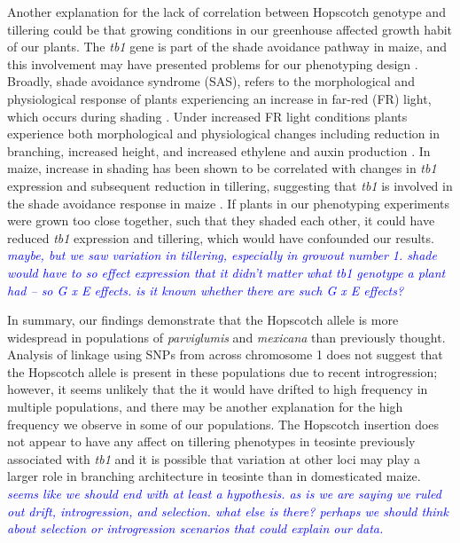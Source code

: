 \documentclass[12pt]{article}
\newcommand{\jri}[1]{\textcolor{blue}{ \emph{\scriptsize  #1}} }
\begin{document}
Another explanation for the lack of correlation between Hopscotch genotype and tillering could be that growing conditions in our greenhouse affected growth habit of our plants. The \emph{tb1} gene is part of the shade avoidance pathway in maize, and this involvement may have presented problems for our phenotyping design \citep{Kebrom and Brutnell 2007}. Broadly, shade avoidance syndrome (SAS), refers to the morphological and physiological response of plants experiencing an increase in far-red (FR) light, which occurs during shading \cite{Kebrom and Brutnell 2007}. Under increased FR light conditions plants experience both morphological and physiological changes including reduction in branching, increased height, and increased ethylene and auxin production \cite{Ballare 1999, Smith and Whitelam 1997}. In maize, increase in shading has been shown to be correlated with changes in \emph{tb1} expression and subsequent reduction in tillering, suggesting that \emph{tb1} is involved in the shade avoidance response in maize \cite{Doebley et al 1997, Lukens and Doebley 1999}. If plants in our phenotyping experiments were grown too close together, such that they shaded each other, it could have reduced \emph{tb1} expression and tillering, which would have confounded our results. \jri{maybe, but we saw variation in tillering, especially in growout number 1. shade would have to so effect expression that it didn't matter what tb1 genotype a plant had -- so G x E effects.  is it known whether there are such G x E effects?}

In summary, our findings demonstrate that the Hopscotch allele is more widespread in populations of \emph{parviglumis} and \emph{mexicana} than previously thought. Analysis of linkage using SNPs from across chromosome 1 does not suggest that the Hopscotch allele is present in these populations due to recent introgression; however, it seems unlikely that the it would have drifted to high frequency in multiple populations, and there may be another explanation for the high frequency we observe in some of our populations. The Hopscotch insertion does not appear to have any affect on tillering phenotypes in teosinte previously associated with \emph{tb1} and it is possible that variation at other loci may play a larger role in branching architecture in teosinte than in domesticated maize. \jri{seems like we should end with at least a hypothesis. as is we are saying we ruled out drift, introgression, and selection. what else is there? perhaps we should think about selection or introgression scenarios that could explain our data.}

\clearpage

\end{document}
